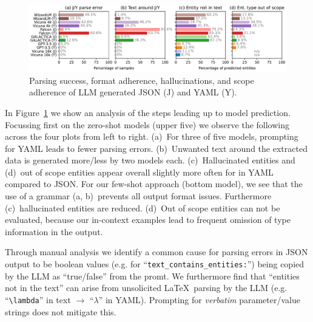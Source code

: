 
\begin{figure}[tb]
  \centering
  \includegraphics[width=\linewidth]{figures/ref_params/format_eval_mix}
  \caption[Parsing success, format adherence, hallucinations, and scope adherence of LLM generated JSON and YAML]{Parsing success, format adherence, hallucinations, and scope adherence of LLM generated JSON (J) and YAML (Y).}
  \label{fig:yamlVSjson}
\end{figure}

In Figure~\ref{fig:yamlVSjson} we show an analysis of the steps leading up to model prediction. Focussing first on the zero-shot models (upper five) we observe the following across the four plots from left to right. (a)~For three of five models, prompting for YAML leads to fewer parsing errors. (b)~Unwanted text around the extracted data is generated more/less by two models each. (c)~Hallucinated entities and (d)~out of scope entities appear overall slightly more often for in YAML compared to JSON. For our few-shot approach (bottom model), we see that the use of a grammar (a, b)~prevents all output format issues. Furthermore (c)~hallucinated entities are reduced. (d)~Out of scope entities can not be evaluated, because our in-context examples lead to frequent omission of type information in the output.

Through manual analysis we identify a common cause for parsing errors in JSON output to be boolean values (e.g. for ``\texttt{text\_\allowbreak contains\_\allowbreak entities:}'') being copied by the LLM as ``true/false'' from the promt. We furthermore find that ``entities not in the text'' can arise from unsolicited \LaTeX\ parsing by the LLM (e.g. ``\verb|\lambda|'' in text $\rightarrow$ ``$\lambda$'' in YAML). Prompting for \emph{verbatim} parameter/value strings does not mitigate this.

